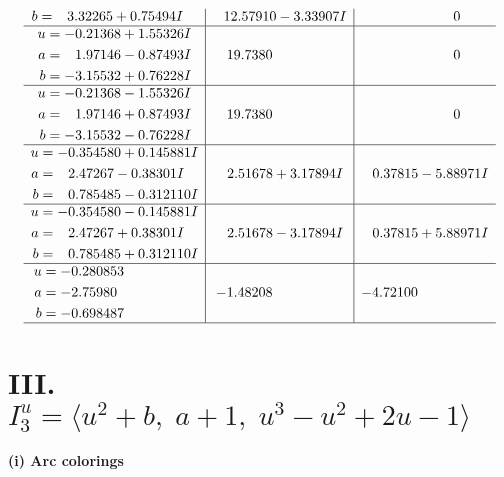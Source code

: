 \documentclass[1p]{elsarticle_modified}
\theoremstyle{definition}
\begin{document}
$$\begin{array}{c|c|c}
\begin{aligned}
b &= \phantom{-}3.32265 + 0.75494 I\end{aligned}
 & \phantom{-}12.57910 - 3.33907 I & \phantom{-0.000000 } 0 \\ \hline\begin{aligned}
u &= -0.21368 + 1.55326 I \\
a &= \phantom{-}1.97146 - 0.87493 I \\
b &= -3.15532 + 0.76228 I\end{aligned}
 & \phantom{-}19.7380\phantom{ +0.000000I} & \phantom{-0.000000 } 0 \\ \hline\begin{aligned}
u &= -0.21368 - 1.55326 I \\
a &= \phantom{-}1.97146 + 0.87493 I \\
b &= -3.15532 - 0.76228 I\end{aligned}
 & \phantom{-}19.7380\phantom{ +0.000000I} & \phantom{-0.000000 } 0 \\ \hline\begin{aligned}
u &= -0.354580 + 0.145881 I \\
a &= \phantom{-}2.47267 - 0.38301 I \\
b &= \phantom{-}0.785485 - 0.312110 I\end{aligned}
 & \phantom{-}2.51678 + 3.17894 I & \phantom{-}0.37815 - 5.88971 I \\ \hline\begin{aligned}
u &= -0.354580 - 0.145881 I \\
a &= \phantom{-}2.47267 + 0.38301 I \\
b &= \phantom{-}0.785485 + 0.312110 I\end{aligned}
 & \phantom{-}2.51678 - 3.17894 I & \phantom{-}0.37815 + 5.88971 I \\ \hline\begin{aligned}
u &= -0.280853\phantom{ +0.000000I} \\
a &= -2.75980\phantom{ +0.000000I} \\
b &= -0.698487\phantom{ +0.000000I}\end{aligned}
 & -1.48208\phantom{ +0.000000I} & -4.72100\phantom{ +0.000000I}\\
 \hline 
 \end{array}$$\newpage\newpage\renewcommand{\arraystretch}{1}
\centering \section*{III. $I^u_{3}= \langle u^2+b,\;a+1,\;u^3- u^2+2 u-1 \rangle$}
\flushleft \textbf{(i) Arc colorings}\\
\end{document}
